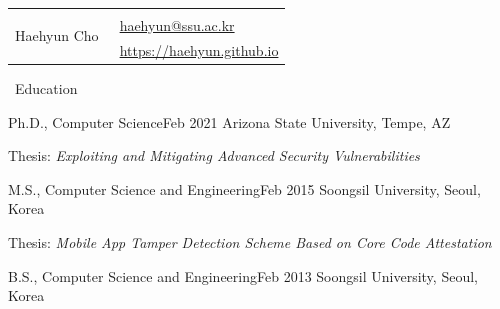 \documentclass{resume} %
\providecommand*\email[1]{\href{mailto:#1}{#1}}
\begin{document}
\begin{table}[t]
\begin{tabular}{ll}
	\multirow{3}{*}{ \Huge{Haehyun Cho} } 
	& \\
	& \hspace{1.7cm}\faEnvelopeSquare~\email{haehyun@ssu.ac.kr}\\
	& \hspace{1.7cm}\faExternalLink~\href{https://haehyun.github.io}{https://haehyun.github.io} \\
\end{tabular}
\end{table}

\vspace{-10mm}

\begin{rSection}{\faGenderless~Education}

	\begin{rSubsection}
		{Ph.D., Computer Science}{Feb 2021}
		{Arizona State University, Tempe, AZ}{}
		\item Thesis: \emph{Exploiting and Mitigating Advanced Security Vulnerabilities}
	\end{rSubsection}
	\vspace{-2mm}
	\begin{rSubsection}
		{M.S., Computer Science and Engineering}{Feb 2015}
		{Soongsil University, Seoul, Korea}{}
		\item Thesis: \emph{Mobile App Tamper Detection Scheme Based on Core Code Attestation}
		
	\end{rSubsection}
	\vspace{-2mm}
	\begin{rSubsection2}
		{B.S., Computer Science and Engineering}{Feb 2013}
		{Soongsil University, Seoul, Korea}{}
	\end{rSubsection2}

\end{rSection}
\end{document}

